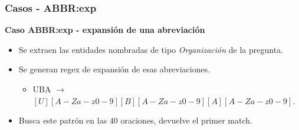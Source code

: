 

\begin{frame}
  \frametitle{Casos - ABBR:exp}
  \textbf{Caso ABBR:exp - expansión de una abreviación}\newline
  \begin{itemize}
    \item Se extraen las entidades nombradas de tipo \textit{Organización} de la pregunta. 
    \item Se generan regex de expansión de esas abreviaciones. 
    \begin{itemize}
       \item UBA $\rightarrow$ $[U][A-Za-z0-9][B][A-Za-z0-9][A][A-Za-z0-9]$.
    \end{itemize}    
    \item Busca este patrón en las 40 oraciones, devuelve el primer match. \newline
  \end{itemize}
\end{frame}


